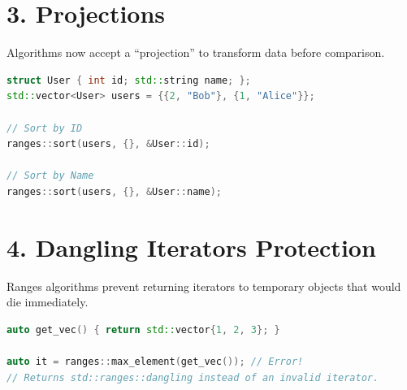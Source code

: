 \hypertarget{projections}{%
\section{3. Projections}\label{projections}}

Algorithms now accept a ``projection'' to transform data before
comparison.

\begin{lstlisting}[language={C++}]
struct User { int id; std::string name; };
std::vector<User> users = {{2, "Bob"}, {1, "Alice"}};

// Sort by ID
ranges::sort(users, {}, &User::id);

// Sort by Name
ranges::sort(users, {}, &User::name);
\end{lstlisting}

\hypertarget{dangling-iterators-protection}{%
\section{4. Dangling Iterators
Protection}\label{dangling-iterators-protection}}

Ranges algorithms prevent returning iterators to temporary objects that
would die immediately.

\begin{lstlisting}[language={C++}]
auto get_vec() { return std::vector{1, 2, 3}; }

auto it = ranges::max_element(get_vec()); // Error! 
// Returns std::ranges::dangling instead of an invalid iterator.
\end{lstlisting}
